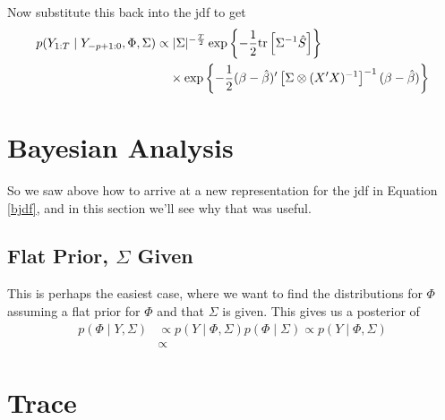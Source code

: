 \documentclass[a4paper,12pt]{scrartcl}
\begin{document}
Now substitute this back into the jdf to get
\begin{align}
    p(Y_{1:T} \; | \; Y_{-p+1:0}, \Phi, \Sigma)
    \propto 
	&\;|\Sigma|^{-\frac{T}{2}} 
	\exp\left\{ -\frac{1}{2} \text{tr} \left[\Sigma^{-1}
	\hat{S} \right] \right\} \notag \\
    &\times
	\exp\left\{ -\frac{1}{2} 
	(\beta - \hat{\beta})'
	\left[\Sigma \otimes (X'X)^{-1}\right]^{-1} 
	(\beta - \hat{\beta}) 
	\right\}  \label{bjdf}
\end{align}


\newpage
\section{Bayesian Analysis}

So we saw above how to arrive at a new representation
for the jdf in Equation \ref{bjdf}, and in this section 
we'll see why that was useful.

\subsection{Flat Prior, $\Sigma$ Given}

This is perhaps the easiest case, where we want to find
the distributions for $\Phi$ assuming a flat prior for
$\Phi$ and that $\Sigma$ is given. This gives us
a posterior of
\begin{align*}
    p(\Phi \; | \; Y, \Sigma) &\propto p( Y \; | \; \Phi, \Sigma)
	p(\Phi \; | \; \Sigma) \propto p(Y \; |\; \Phi, \Sigma)\\
    &\propto 	
\end{align*}



\newpage
\appendix
\section{Trace}
\end{document}
